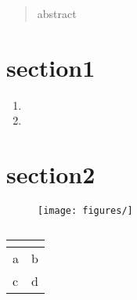 
  \begin{abstract}
    abstract
  \end{abstract} 

  \section{section1}
    \begin{enumerate}
      \item 
      \item
    \end{enumerate}
  
    \subsection{}

  \section{section2}
    \begin{figure}
      \begin{center}
        \texttt{[image: figures/]}
      \end{center}
      \caption{}
      \label{fig:}
    \end{figure}
    
    \begin{table}
      \caption{}
      \label{tab:}
      \begin{center}
        \begin{tabular}[c]{l|l}
          \hline
          \multicolumn{1}{c|}{\textbf{}} & 
          \multicolumn{1}{c}{\textbf{}} \\
          \hline
          a & b \\
          c & d \\
          
          \hline
        \end{tabular}
      \end{center}
    \end{table}
    
    

